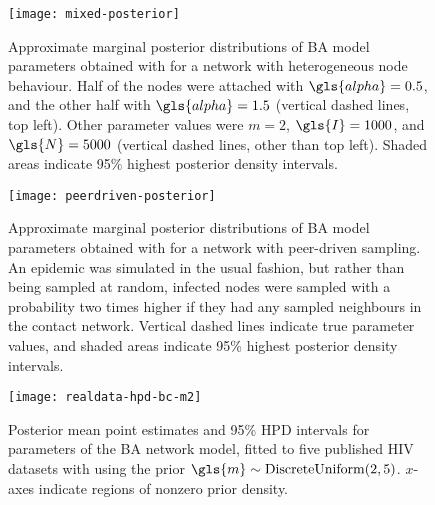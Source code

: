\begin{figure}[ht]
    \centering
    \texttt{[image: mixed-posterior]}
    \caption[
        Approximate marginal posterior distributions of \gls{BA} model
        parameters obtained with  for a network with
        heterogeneous node behaviour.
    ]{
        Approximate marginal posterior distributions of \gls{BA} model
        parameters obtained with  for a network with
        heterogeneous node behaviour. Half of the nodes were attached with
        $\gls{alpha} = 0.5$, and the other half with $\gls{alpha} = 1.5$
        (vertical dashed lines, top left). Other parameter values were $m = 2$,
        $\gls{I} = 1000$, and $\gls{N} = 5000$ (vertical dashed lines, other
        than top left). Shaded areas indicate 95\% highest posterior density
        intervals.
    }
    \label{fig:mixed}
\end{figure}

\begin{figure}[ht]
    \centering
    \texttt{[image: peerdriven-posterior]}
    \caption[
        Approximate marginal posterior distributions of \gls{BA}
        model parameters obtained with  for a network with
        peer-driven sampling.
    ]{
        Approximate marginal posterior distributions of \gls{BA}
        model parameters obtained with  for a network with
        peer-driven sampling. An epidemic was simulated in the usual fashion,
        but rather than being sampled at random, infected nodes were sampled
        with a probability two times higher if they had any sampled neighbours
        in the contact network. Vertical dashed lines indicate true parameter
        values, and shaded areas indicate 95\% highest posterior density
        intervals.
    }
    \label{fig:peerdriven}
\end{figure}

\begin{figure}[ht]
    \texttt{[image: realdata-hpd-bc-m2]}
    \caption[
        Posterior mean point estimates and 95\% \gls{HPD} intervals for
        parameters of the \gls{BA} network model, fitted to eleven \gls{HIV}
        datasets with  using the prior \gls{m} $\sim$
        DiscreteUniform(2, 5).
    ]{
        Posterior mean point estimates and 95\% \gls{HPD} intervals for
        parameters of the \gls{BA} network model, fitted to five published
        \gls{HIV} datasets with  using the prior $\gls{m}
        \sim \DiscreteUniform(2, 5)$. $x$-axes indicate regions of nonzero
        prior density. 
    }
    \label{fig:abchpdm2}
\end{figure}

